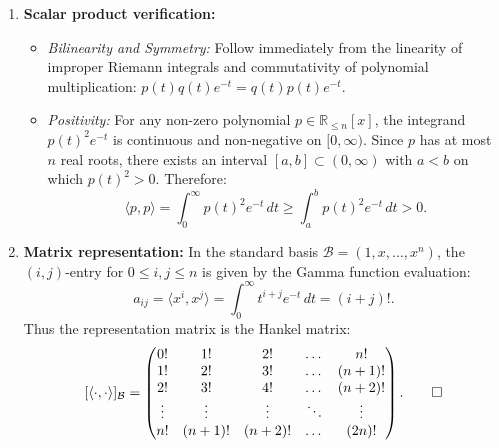 \begin{exercisesolution}
\label{sol:exponential_weighted_polynomial_inner_product}
\begin{enumerate}[label=\textbf{(\alph*)}]
    \item \textbf{Scalar product verification:}
    \begin{itemize}
        \item \emph{Bilinearity and Symmetry:} Follow immediately from the linearity of improper Riemann integrals and commutativity of polynomial multiplication: $p(t)q(t)e^{-t} = q(t)p(t)e^{-t}$.
        \item \emph{Positivity:} For any non-zero polynomial $p \in \mathbb{R}_{\le n}[x]$, the integrand $p(t)^2 e^{-t}$ is continuous and non-negative on $[0, \infty)$.
        Since $p$ has at most $n$ real roots, there exists an interval $[a, b] \subset (0, \infty)$ with $a < b$ on which $p(t)^2 > 0$.
        Therefore:
        \[
        \langle p, p \rangle = \int_0^\infty p(t)^2 e^{-t} \, dt \ge \int_a^b p(t)^2 e^{-t} \, dt > 0.
        \]
    \end{itemize}

    \item \textbf{Matrix representation:}
    In the standard basis $\mathcal{B} = (1, x, \dots, x^n)$, the $(i, j)$-entry for $0 \le i, j \le n$ is given by the Gamma function evaluation:
    \[
    a_{ij} = \langle x^i, x^j \rangle = \int_0^\infty t^{i+j} e^{-t} \, dt = (i + j)!.
    \]
    Thus the representation matrix is the Hankel matrix:
    \[
    [\langle \cdot, \cdot \rangle]_\mathcal{B} = \begin{pmatrix}
      0! & 1! & 2! & \dots & n! \\
      1! & 2! & 3! & \dots & (n+1)! \\
      2! & 3! & 4! & \dots & (n+2)! \\
      \vdots & \vdots & \vdots & \ddots & \vdots \\
      n! & (n+1)! & (n+2)! & \dots & (2n)!
    \end{pmatrix}. \qedhere
    \]
\end{enumerate}
\end{exercisesolution}


